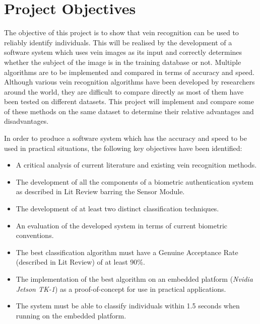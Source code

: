 \section{Project Objectives}

The objective of this project is to show that vein recognition can be used to reliably identify individuals. This will be realised by the development of a software system which uses vein images as its input and correctly determines whether the subject of the image is in the training database or not. Multiple algorithms are to be implemented and compared in terms of accuracy and speed. Although various vein recognition algorithms have been developed by researchers around the world, they are difficult to compare directly as most of them have been tested on different datasets. This project will implement and compare some of these methods on the same dataset to determine their relative advantages and disadvantages.
\par
In order to produce a software system which has the accuracy and speed to be used in practical situations, the following key objectives have been identified:
\begin{itemize}
	\item A critical analysis of current literature and existing vein recognition methods.
	\item The development of all the components of a biometric authentication system as described in Lit Review barring the Sensor Module.
	\item The development of at least two distinct classification techniques.
	\item An evaluation of the developed system in terms of current biometric conventions.
	\item The best classification algorithm must have a Genuine Acceptance Rate (described in Lit Review) of at least 90\%.
	\item The implementation of the best algorithm on an embedded platform (\textit{Nvidia Jetson TK-1}) as a proof-of-concept for use in practical applications. 
	\item The system must be able to classify individuals within 1.5 seconds when running on the embedded platform. 
\end{itemize}
